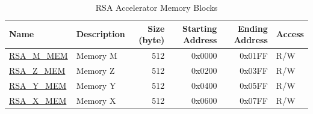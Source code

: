 \begin{longtable}{ | l | l | r | r | r | l | }
\caption{RSA Accelerator Memory Blocks} \label{regdesc:RSAmemory}
\\ \hline
\rowcolor{lightgray}
\textbf{Name} & \textbf{Description}  &  \textbf{Size (byte)}  &  \textbf{Starting Address}  &  \textbf{Ending Address}  & \textbf{Access}   \\ \hline

\hyperref[regdesc:RSAmemory]{RSA\_M\_MEM} & Memory M  & 512  & 0x0000 & 0x01FF & R/W \\ \hline
\hyperref[regdesc:RSAmemory]{RSA\_Z\_MEM} & Memory Z  & 512  & 0x0200 & 0x03FF & R/W \\ \hline
\hyperref[regdesc:RSAmemory]{RSA\_Y\_MEM} & Memory Y  & 512  & 0x0400 & 0x05FF & R/W \\ \hline
\hyperref[regdesc:RSAmemory]{RSA\_X\_MEM} & Memory X  & 512  & 0x0600 & 0x07FF & R/W \\ \hline

\end{longtable}
